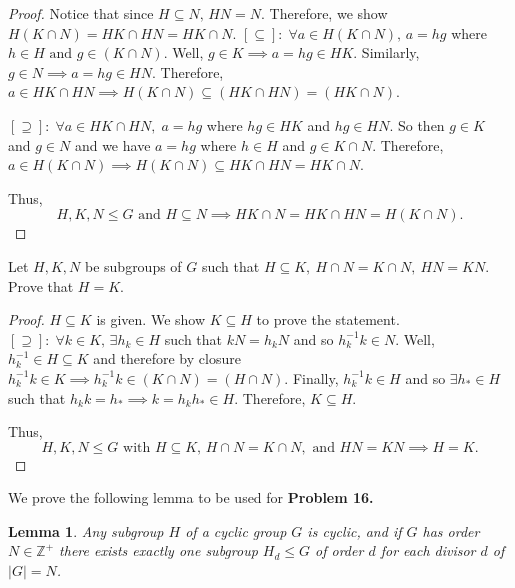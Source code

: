 \documentclass[addpoints,10pt]{exam}
\theoremstyle{plain}
\theoremstyle{definition}
\newtheorem{prob}[thm]{Problem}
\theoremstyle{plain}
\theoremstyle{plain}
\newtheorem*{lem*}{Lemma}
\theoremstyle{definition}
\let\oldprob\prob
\let\endoldprob\endprob
\renewenvironment{prob}
  {\begin{singlespace}\oldprob}
  {\endoldprob\end{singlespace}}
\newcommand{\belowtitle}{\leavevmode\newline}
\newcommand{\ZZ}{\ensuremath{\mathbb{Z}}}
\begin{document}
\begin{proof}
  Notice that since $H\subseteq N,\, HN=N$. Therefore, we show $H(K\cap N)=HK\cap HN=HK\cap N.$\belowtitle
  $\mathbf{[\subseteq]:\;} \forall a\in H(K\cap N),\,a=hg$ where $h\in H\text{ and }g\in (K\cap N).$ Well, $g\in K\implies a=hg\in HK.$ Similarly, $g\in N \implies a=hg\in HN.$ Therefore, $a\in HK\cap HN\implies H(K\cap N)\subseteq (HK\cap HN)=(HK\cap N)$.

  $\mathbf{[\supseteq]:\;} \forall a\in HK\cap HN,\;a=hg$ where $hg\in HK$ and $hg\in HN.$ So then $g\in K$ and $g\in N$ and we have $a=hg$ where $h\in H$ and $g\in K\cap N$. Therefore, $a\in H(K\cap N)\implies H(K\cap N)\subseteq HK\cap HN=HK\cap N$.

  Thus,
  $$H,K,N\leq G\text{ and }H\subseteq N\implies HK\cap N=HK\cap HN=H(K\cap N).$$

\end{proof}
\newpage

\begin{prob}
  Let $H,K,N$ be subgroups of $G$ such that $H\subseteq K,\ H\cap N=K\cap N,\ HN=KN$. Prove that $H=K$.
\end{prob}

\begin{proof}
  $H\subseteq K$ is given. We show $K\subseteq H$ to prove the statement.\belowtitle
  $\mathbf{[\supseteq]:\;} \forall k\in K,\,\exists h_{k}\in H$ such that $kN=h_{k}N$ and so $h_{k}^{-1}k\in N.$ Well, $h_{k}^{-1}\in H\subseteq K$ and therefore by closure $h_{k}^{-1}k\in K\implies h_{k}^{-1}k\in (K\cap N)=(H\cap N).$ Finally, $h_{k}^{-1}k\in H$ and so $\exists h_{*}\in H$ such that $h_{k}k=h_{*}\implies k=h_{k}h_{*}\in H.$ Therefore, $K\subseteq H.$

  Thus,
  $$H,K,N\leq G\text{ with }H\subseteq K,\,H\cap N=K\cap N,\text{ and }HN=KN\implies H=K.$$
\end{proof}
\newpage
We prove the following lemma to be used for \textbf{Problem 16.}

\begin{lem*}
  Any subgroup $H$ of a cyclic group $G$ is cyclic, and if $G$ has order $N\in \ZZ^{+}$ there exists exactly one subgroup $H_{d}\leq G$ of order $d$ for each divisor $d$ of $|G|=N$.
\end{lem*}
\end{document}
